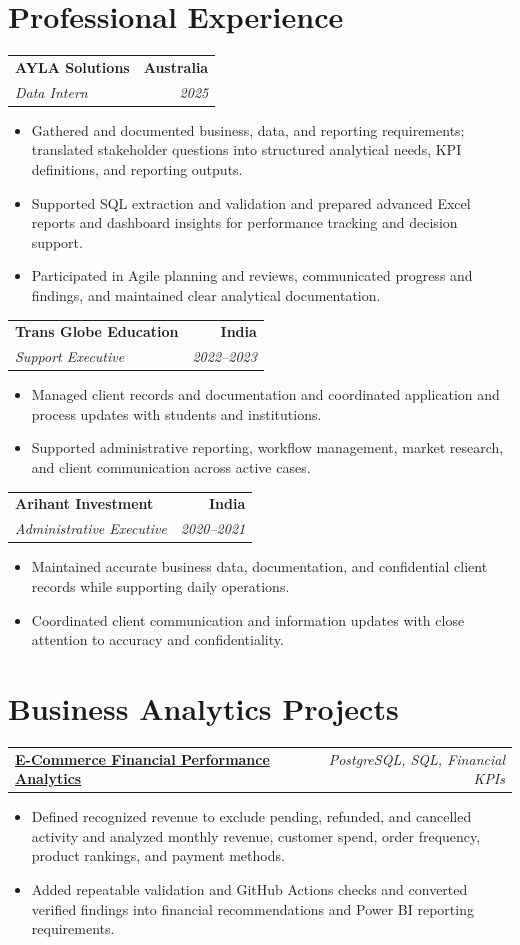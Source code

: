 \documentclass[letterpaper,10pt]{article}
\makeatletter
\newcommand{\role}[4]{%
  \begin{tabularx}{\textwidth}{@{}Xr@{}}
    \textbf{#1} & \textbf{#2} \\
    \textit{#3} & \textit{#4}
  \end{tabularx}\vspace{-1pt}
}
\newcommand{\project}[2]{%
  \begin{tabularx}{\textwidth}{@{}Xr@{}}
    \textbf{#1} & \textit{#2}
  \end{tabularx}\vspace{-1pt}
}
\makeatother
\begin{document}
\section{Professional Experience}
\role{AYLA Solutions}{Australia}{Data Intern}{2025}
\begin{itemize}
  \item Gathered and documented business, data, and reporting requirements; translated stakeholder questions into structured analytical needs, KPI definitions, and reporting outputs.
  \item Supported SQL extraction and validation and prepared advanced Excel reports and dashboard insights for performance tracking and decision support.
  \item Participated in Agile planning and reviews, communicated progress and findings, and maintained clear analytical documentation.
\end{itemize}
\vspace{1pt}

\role{Trans Globe Education}{India}{Support Executive}{2022--2023}
\begin{itemize}
  \item Managed client records and documentation and coordinated application and process updates with students and institutions.
  \item Supported administrative reporting, workflow management, market research, and client communication across active cases.
\end{itemize}
\vspace{1pt}

\role{Arihant Investment}{India}{Administrative Executive}{2020--2021}
\begin{itemize}
  \item Maintained accurate business data, documentation, and confidential client records while supporting daily operations.
  \item Coordinated client communication and information updates with close attention to accuracy and confidentiality.
\end{itemize}

\section{Business Analytics Projects}
\project{\href{https://github.com/jainalimehta/Ecommerce-Sales-Analytics}{E-Commerce Financial Performance Analytics}}{PostgreSQL, SQL, Financial KPIs}
\begin{itemize}
  \item Defined recognized revenue to exclude pending, refunded, and cancelled activity and analyzed monthly revenue, customer spend, order frequency, product rankings, and payment methods.
  \item Added repeatable validation and GitHub Actions checks and converted verified findings into financial recommendations and Power BI reporting requirements.
\end{itemize}
\vspace{1pt}
\end{document}
